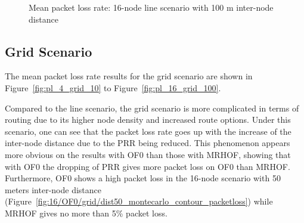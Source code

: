 \begin{figure}[p]
  \centering
    \leavevmode
  \caption{Mean packet loss rate: 16-node line scenario with 100 m inter-node distance}
  \label{fig:pl_16_line_100}
   \vspace{-20pt}
\end{figure}

\clearpage
\subsection{Grid Scenario}
\label{pl:grid}
The mean packet loss rate results for the grid scenario are shown in Figure~\ref{fig:pl_4_grid_10} to Figure~\ref{fig:pl_16_grid_100}.

Compared to the line scenario, the grid scenario is more complicated in terms of routing due to its higher node density and increased route options.  Under this scenario, one can see that the packet loss rate goes up with the increase of the inter-node distance due to the PRR being reduced. This phenomenon appears more obvious on the results with OF0 than those with MRHOF, showing that with OF0 the dropping of PRR gives more packet loss on OF0 than MRHOF. Furthermore, OF0 shows a high packet loss in the 16-node scenario with 50 meters inter-node distance (Figure~\ref{fig:16/OF0/grid/dist50_montecarlo_contour_packetloss}) while MRHOF gives no more than 5\% packet loss.

